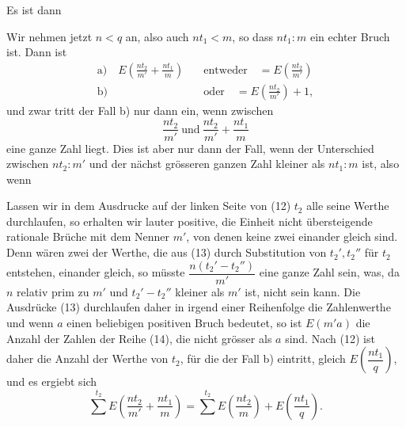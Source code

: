 Es ist dann

Wir nehmen jetzt $n < q$ an, also auch $n t_1 < m$, so dass
$n t_1 : m$ ein echter Bruch ist. Dann ist
\[
\begin{aligned}
\text{a)} \quad E\left(\frac{n t_2}{m'} + \frac{n t_1}{m}\right)
  &\quad \text{entweder}\quad = E\left(\frac{n t_2}{m'}\right) \\
\text{b)} \quad
  &\quad \text{oder}\quad = E\left(\frac{n t_2}{m'}\right) + 1,
\end{aligned}
\]
und zwar tritt der Fall b) nur dann ein, wenn zwischen
\[
\frac{n t_2}{m'}\ \text{und}\ \frac{n t_2}{m'} + \frac{n t_1}{m}
\]
eine ganze Zahl liegt. Dies ist aber nur dann der Fall, wenn
der Unterschied zwischen $n t_2 : m'$ und der nächst grösseren
ganzen Zahl kleiner als $n t_1 : m$ ist, also wenn

Lassen wir in dem Ausdrucke auf der linken Seite von (12)
$t_2$ alle seine Werthe durchlaufen, so erhalten wir lauter positive,
die Einheit nicht übersteigende rationale Brüche mit dem
Nenner $m'$, von denen keine zwei einander gleich sind. Denn
wären zwei der Werthe, die aus (13) durch Substitution von
$t_2', t_2''$ für $t_2$ entstehen, einander gleich, so müsste $\dfrac{n(t_2' - t_2'')}{m'}$ eine
ganze Zahl sein, was, da $n$ relativ prim zu $m'$ und $t_2' - t_2''$ kleiner
als $m'$ ist, nicht sein kann. Die Ausdrücke (13) durchlaufen
daher in irgend einer Reihenfolge die Zahlenwerthe
und wenn $a$ einen beliebigen positiven Bruch bedeutet, so ist
$E(m' a)$ die Anzahl der Zahlen der Reihe (14), die nicht grösser
als $a$ sind. Nach (12) ist daher die Anzahl der Werthe von $t_2$,
für die der Fall b) eintritt, gleich $E\left(\dfrac{n t_1}{q}\right)$, und es ergiebt sich
\[
\sum^{t_2} E\left(\frac{n t_2}{m'} + \frac{n t_1}{m}\right) = \sum^{t_2} E\left(\frac{n t_2}{m}\right) + E\left(\frac{n t_1}{q}\right). %
\]
